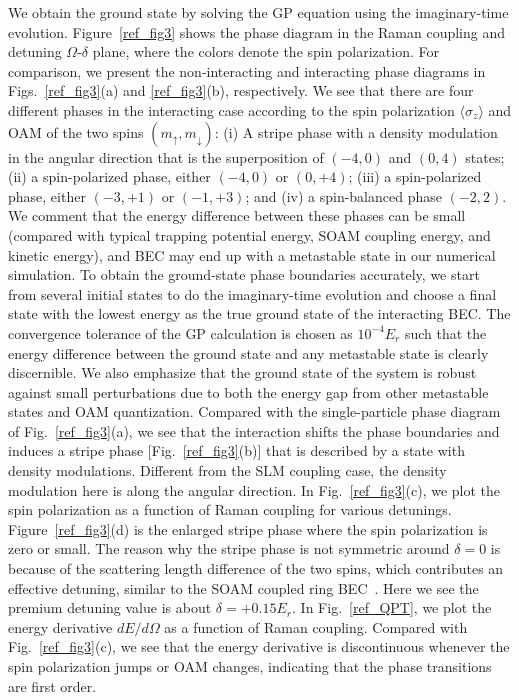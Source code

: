 \documentclass[twocolumn,pra,unsortedaddress,showpacs,floatfix,citeautoscript,nofootinbib]{revtex4-1}
\begin{document}
We obtain the ground state by solving the GP equation using the
imaginary-time evolution. Figure~\ref{ref_fig3} shows the phase
diagram in the Raman coupling and detuning $\Omega$-$\delta $
plane, where the colors denote the spin polarization. For
comparison, we present the non-interacting and interacting phase
diagrams in Figs.~\ref{ref_fig3}(a) and \ref{ref_fig3}(b),
respectively. We see that there are four different phases in the
interacting case according to the spin polarization $\langle
\sigma _{z}\rangle $ and OAM of the two spins $(m_{\uparrow
},m_{\downarrow })$: (i) A stripe phase with a density modulation
in the angular direction that is the superposition of $(-4,0)$ and
$(0,4)$ states; (ii) a spin-polarized phase, either $(-4,0)$ or
$(0,+4)$; (iii) a spin-polarized phase, either $(-3,+1)$ or
$(-1,+3)$; and (iv) a spin-balanced phase $(-2,2)$. We comment
that the energy difference between these phases can be small
(compared with typical trapping potential energy, SOAM coupling
energy, and kinetic energy), and BEC may end up with a metastable
state in our numerical simulation. To obtain the ground-state
phase boundaries accurately, we start from several initial states
to do the imaginary-time evolution and choose a final state with
the lowest energy as the true ground state of the interacting BEC.
The convergence tolerance of the GP calculation is chosen as
$10^{-4}E_r$ such that the energy difference between the ground
state and any metastable state is clearly discernible. We also
emphasize that the ground state of the system is robust against
small perturbations due to both the energy gap from other
metastable states and OAM quantization. Compared with the
single-particle phase diagram of Fig.~\ref{ref_fig3}(a), we see
that the interaction shifts the phase boundaries and induces a
stripe phase [Fig.~\ref{ref_fig3}(b)] that is described by a state
with density modulations. Different from the SLM coupling case,
the density modulation here is along the angular direction. In
Fig.~\ref{ref_fig3}(c), we plot the spin polarization as a
function of Raman coupling for various detunings.
Figure~\ref{ref_fig3}(d) is the enlarged stripe phase where the
spin polarization is zero or small. The reason why the stripe
phase is not symmetric around $\delta =0$ is because of the
scattering length difference of the two spins, which contributes
an effective detuning, similar to the SOAM coupled ring
BEC~\cite{Sun2014}. Here we see the premium detuning value is
about $\delta =+0.15E_{r}$. In Fig.~\ref{ref_QPT}, we plot the
energy derivative $dE/d\Omega$ as a function of Raman coupling.
Compared with Fig.~\ref{ref_fig3}(c), we see that the energy
derivative is discontinuous whenever the spin polarization jumps
or OAM changes, indicating that the phase transitions are first
order.
\end{document}
